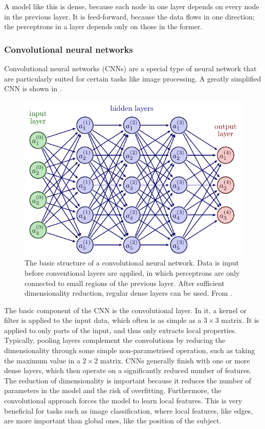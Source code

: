 A model like this is dense, because each node in one layer depends on every node in the previous layer.
It is feed-forward, because the data flows in one direction; the perceptrons in a layer depends only on those in the former.



\subsubsection{Convolutional neural networks}
Convolutional neural networks (CNNs) are a special type of neural network that are particularly suited for certain tasks like image processing.
A greatly simplified CNN is shown in .

\begin{figure}
    \centering
    \includegraphics[width=0.8\linewidth, page=7]{neural_networks.pdf}
    \caption{
        The basic structure of a convolutional neural network.
        Data is input before conventional layers are applied, in which perceptrons are only connected to small regions of the previous layer.
        After sufficient dimensionality reduction, regular dense layers can be used.
        From \cite{nn_figs}.
    }
    \label{fig:cnn}
\end{figure}

The basic component of the CNN is the convolutional layer.
In it, a kernel or filter is applied to the input data, which often is as simple as a $3 \times 3$ matrix.
It is applied to only parts of the input, and thus only extracts local properties.
Typically, pooling layers complement the convolutions by reducing the dimensionality through some simple non-parametrised operation, such as taking the maximum value in a $2 \times 2$ matrix.
CNNs generally finish with one or more dense layers, which then operate on a significantly reduced number of features.
The reduction of dimensionality is important because it reduces the number of parameters in the model and the risk of overfitting.
Furthermore, the convolutional approach forces the model to learn local features.
This is very beneficial for tasks such as image classification, where local features, like edges, are more important than global ones, like the position of the subject.